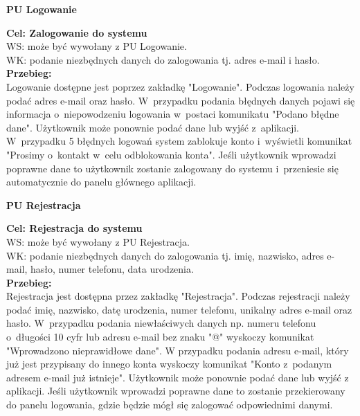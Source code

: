 \documentclass[12pt, letterpaper]{article}
\begin{document}
		
		
		\textbf{PU Logowanie}
		
		\quad
		
		\textbf{Cel: Zalogowanie do systemu}\\
		
		WS: może być wywołany z PU Logowanie.\\
		
		WK: podanie niezbędnych danych do zalogowania tj. adres e-mail i hasło.\\
		
		\textbf{Przebieg:}\\
		Logowanie dostępne jest poprzez zakładkę "Logowanie". Podczas logowania należy podać adres e-mail oraz hasło. W~przypadku podania błędnych danych pojawi się informacja o~niepowodzeniu logowania w~postaci komunikatu "Podano błędne dane". Użytkownik może ponownie podać dane lub wyjść z~aplikacji. W~przypadku 5 błędnych logowań system zablokuje konto i~wyświetli komunikat "Prosimy o~kontakt w~celu odblokowania konta". Jeśli użytkownik wprowadzi poprawne dane to użytkownik zostanie zalogowany do systemu i~przeniesie się automatycznie do panelu głównego aplikacji.\\
		
		
		\newpage		
		
		\textbf{PU Rejestracja}
		
		\quad
		
		\textbf{Cel: Rejestracja do systemu}\\
		
		WS: może być wywołany z PU Rejestracja.\\
		
		WK: podanie niezbędnych danych do zalogowania tj. imię, nazwisko, adres e-mail, hasło, numer telefonu, data urodzenia.\\
		
		\textbf{Przebieg:}\\
		Rejestracja jest dostępna przez zakładkę "Rejestracja". Podczas rejestracji należy podać imię, nazwisko, datę urodzenia, numer telefonu, unikalny adres e-mail oraz hasło. W~przypadku podania niewłaściwych danych np. numeru telefonu o~długości 10 cyfr lub adresu e-mail bez znaku "@" wyskoczy komunikat "Wprowadzono nieprawidłowe dane". W przypadku podania adresu e-mail, który już jest przypisany do innego konta wyskoczy komunikat "Konto z~podanym adresem e-mail już istnieje". Użytkownik może ponownie podać dane lub wyjść z aplikacji. Jeśli użytkownik wprowadzi poprawne dane to zostanie przekierowany do panelu logowania, gdzie będzie mógł się zalogować odpowiednimi danymi. \\
		
\end{document}
